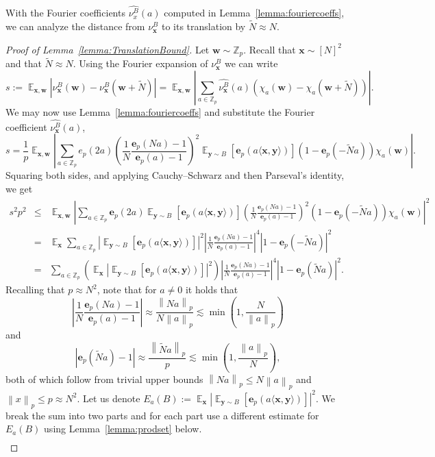 \documentclass[11pt]{article}
\numberwithin{equation}{section}
\theoremstyle{definition}
\theoremstyle{plain}
\newcommand{\Z}{\mathbb Z}
\theoremstyle{definition}\newtheorem{problem}[theorem]{Problem}\theoremstyle{plain}
\DeclareMathOperator{\Ex}{{\mathbb E}}
\newcommand{\e}{\mathbf{e}}
\newcommand{\x}{\mathbf{x}}
\newcommand{\y}{\mathbf{y}}
\newcommand{\w}{\mathbf{w}}
\newcommand{\ip}[1]{\langle #1 \rangle}
\newcommand{\norm}[1]{\left\| #1 \right\|_p}
\begin{document}
With the Fourier coefficients $\widehat{\nu^B_x}(a)$ computed in Lemma~\ref{lemma:fouriercoeffs}, we can analyze the distance from $\nu^B_\x$ to its translation by $\tilde{N} \approx N$.

\begin{proof}[Proof of Lemma~\ref{lemma:TranslationBound}]
Let $\w \sim \Z_p$. Recall that $\x \sim [N]^2$ and that $\tilde{N} \approx N$.
Using the Fourier expansion of $\nu_{\x}^B$ we can write
	$$ s := \Ex_{\x,\w} |\nu_{\x}^B(\w) -\nu_{\x}^B(\w+\tilde{N})| = \Ex_{\x,\w} \left| \sum_{a\in \Z_p} \widehat{\nu^B_\x}(a) \left(\chi_a(\w)-\chi_a(\w+\tilde{N}) \right) \right|.$$
	We may now use Lemma~\ref{lemma:fouriercoeffs} and substitute the Fourier coefficient $\widehat{\nu^B_\x}(a)$,
	$$
		s =    \frac{1}{p} \Ex_{\x,\w}  \left|\sum_{a\in \Z_p}
 e_p(2a)  \left(\frac{1}{N} \frac{\e_p(Na)-1}{\e_p(a)-1}\right)^2 \Ex_{\y \sim B}   \left[ \e_p(a\ip{\x,\y})\right] (1-\e_p(-\tilde{N}a))\chi_a(\w)  \right|.
  $$
  Squaring both sides, and applying Cauchy--Schwarz and then Parseval's identity, we get
  \begin{eqnarray*}
	  s^2p^2 &\le&    \Ex_{\x,\w}  \left|\sum_{a\in \Z_p} \e_p(2a) \Ex_{\y \sim B}   \left[ \e_p(a\ip{\x,\y})\right]\left(\frac{1}{N} \frac{\e_p(Na)-1}{\e_p(a)-1}\right)^2 (1-\e_p(-\tilde{N}a))\chi_a(\w)\right|^2 \nonumber \\
	  &=&  \Ex_\x \sum_{a\in \Z_p}  \left|\Ex_{\y \sim B}   \left[ \e_p(a\ip{\x,\y})\right]\right|^2 \left|\frac{1}{N} \frac{\e_p(Na)-1}{\e_p(a)-1}\right|^4 |1-\e_p(-\tilde{N}a)|^2 \nonumber  \\
	  &=&  \sum_{a\in \Z_p}  \left( \Ex_\x  \left|\Ex_{\y \sim B}   \left[ \e_p(a\ip{\x,\y})\right]\right|^2\right) \left|\frac{1}{N} \frac{\e_p(Na)-1}{\e_p(a)-1}\right|^4 |1-\e_p(\tilde{N}a)|^2 \label{eq:main}.
  \end{eqnarray*}
  Recalling that $p \approx N^2$, note that for $a \neq 0$ it holds that
	$$\left|\frac{1}{N} \frac{\e_p(Na)-1}{\e_p(a)-1}\right| \approx \frac{\norm{Na}}{N\norm{a}}\lesssim \min\left(1, \frac{N}{\norm{a}}\right)$$
 and
	$$ |\e_p(\tilde{N}a)-1| \approx \frac{\norm{\tilde{N}a}}{p}\lesssim \min \left(1, \frac{\norm{a}}{N}\right), $$
	both of which follow from trivial upper bounds $\norm{Na} \leq N\norm{a}$ and $\norm{x}\leq p \approx N^2$.
	 Let us denote $ E_a(B) :=   \Ex_\x  \left|\Ex_{\y \sim B}   \left[ \e_p(a\ip{\x,\y})\right]\right|^2$.
	 We break  the sum into two parts and for each part use a different estimate for $ E_a(B)$ using Lemma~\ref{lemma:prodset} below.
 \begin{eqnarray*}

\end{eqnarray*}
\end{proof}
\end{document}
